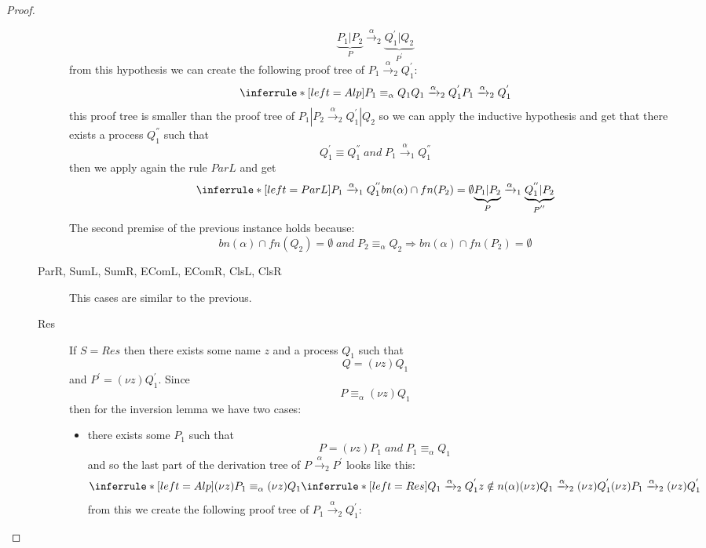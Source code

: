 \begin{theorem}
\begin{proof}
\begin{description}
\begin{description}
\[{{		  }
	      }{
		\underbrace{P_{1}|P_{2}}_{P}\xrightarrow{\alpha}_{2}\underbrace{Q_{1}^{'}|Q_{2}}_{P^{'}}
	      }
	    \]
	    from this hypothesis we can create the following proof tree of $P_{1}\xrightarrow{\alpha}_{2}Q_{1}^{'}$:
	    \[
	      \inferrule* [left=Alp]{
		  P_{1}\equiv_{\alpha}Q_{1}
		\\
		  Q_{1}\xrightarrow{\alpha}_{2}Q_{1}^{'}
	      }{
		P_{1}\xrightarrow{\alpha}_{2}Q_{1}^{'}
	      }
	    \]
	    this proof tree is smaller than the proof tree of $P_{1}|P_{2}\xrightarrow{\alpha}_{2}Q_{1}^{'}|Q_{2}$ so we can apply the inductive hypothesis and get that there exists a process $Q_{1}^{''}$ such that
	    \[
	      Q_{1}^{'}\equiv Q_{1}^{''}\; and\; P_{1}\xrightarrow{\alpha}_{1}Q_{1}^{''} 
	    \]
	    then we apply again the rule $ParL$ and get 
	    \[
	      \inferrule* [left=ParL]{
		  P_{1}\xrightarrow{\alpha}_{1}Q_{1}^{''} 
		\\
		  bn(\alpha) \cap fn(P_{2})=\emptyset
	      }{
		\underbrace{P_{1}|P_{2}}_{P}\xrightarrow{\alpha}_{1}\underbrace{Q_{1}^{''}|P_{2}}_{P^{''}}
	      }
	    \]
	    The second premise of the previous instance holds because:
	    \[
	      bn(\alpha)\cap fn(Q_{2})=\emptyset\; and\; P_{2}\equiv_{\alpha}Q_{2}\Rightarrow bn(\alpha)\cap fn(P_{2})=\emptyset
	    \]
	  \item[ParR, SumL, SumR, EComL, EComR, ClsL, ClsR] 
	    This cases are similar to the previous.
	  \item[Res]
	    If $S=Res$ then there exists some name $z$ and a process $Q_{1}$ such that 
	    \[
	      Q=(\nu z)Q_{1}
	    \]
	    and $P^{'}=(\nu z)Q_{1}^{'}$. Since 
	    \[
	      P\equiv_{\alpha}(\nu z)Q_{1}
	    \]
	    then for the inversion lemma we have two cases:
	    \begin{itemize}
	      \item 
		there exists some $P_{1}$ such that 
		\[
		  P=(\nu z)P_{1}\; and\; P_{1}\equiv_{\alpha}Q_{1}
		\]
		and so the last part of the derivation tree of $P\xrightarrow{\alpha}_{2}P^{'}$ looks like this:
		\[
		  \inferrule* [left=Alp]{
		      (\nu z)P_{1}\equiv_{\alpha}(\nu z)Q_{1}
		    \\
		      \inferrule* [left=Res]{
			  Q_{1}\xrightarrow{\alpha}_{2}Q_{1}^{'}
			\\
			  z\notin n(\alpha)
		      }{
			(\nu z)Q_{1}\xrightarrow{\alpha}_{2}(\nu z)Q_{1}^{'}
		      }
		  }{
		    (\nu z)P_{1}\xrightarrow{\alpha}_{2}(\nu z)Q_{1}^{'}
		  }
		\]
		from this we create the following proof tree of $P_{1}\xrightarrow{\alpha}_{2}Q_{1}^{'}$:

\end{itemize}
\end{description}
\end{description}
\end{proof}
\end{theorem}

